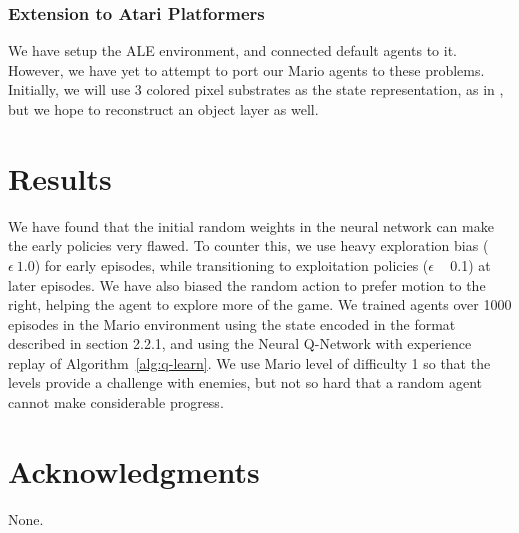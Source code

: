 \documentclass{article}
\begin{document}
\subsubsection{Extension to Atari Platformers}
We have setup the ALE environment, and connected default agents to it. However, we have yet to attempt to port our Mario agents to these problems. Initially, we will use 3 colored pixel substrates as the state representation, as in \cite{Hauskneck13}, but we hope to reconstruct an object layer as well.
 
 \section{Results}
 
We have found that the initial random weights in the neural network can make the early policies very flawed. To counter this, we use heavy exploration bias ($\epsilon ~ 1.0$) for early episodes, while transitioning to exploitation policies ($\epsilon$ ~ 0.1) at later episodes. We have also biased the random action to prefer motion to the right, helping the agent to explore more of the game. We trained agents over 1000 episodes in the Mario environment using the state encoded in the format described in section 2.2.1, and using the Neural Q-Network with experience replay of Algorithm~\ref{alg:q-learn}. We use Mario level of difficulty 1 so that the levels provide a challenge with enemies, but not so hard that a random agent cannot make considerable progress.
 
\section*{Acknowledgments} 
 
None.



\end{document}
